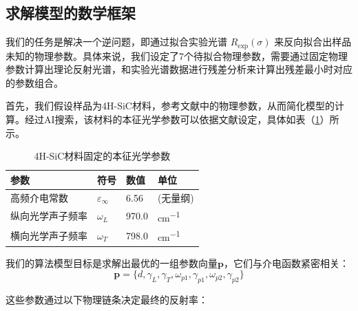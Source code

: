 \documentclass[a4paper]{ctexart}
\begin{document}


\subsection{求解模型的数学框架}
我们的任务是解决一个逆问题，即通过拟合实验光谱 $R_{\text{exp}}(\sigma)$ 来反向拟合出样品未知的物理参数。具体来说，我们设定了7个待拟合物理参数，需要通过固定物理参数计算出理论反射光谱，和实验光谱数据进行残差分析来计算出残差最小时对应的参数组合。

首先，我们假设样品为4H-SiC材料，参考文献中的物理参数，从而简化模型的计算。经过AI\cite{ai:gemini}搜索，该材料的本征光学参数可以依据文献\cite{oishi2006simultaneous}设定，具体如表（\ref{tab:sic_params}）所示。

\begin{table}[h!]
\centering
\caption{4H-SiC材料固定的本征光学参数}
\label{tab:sic_params}
\begin{tabular}{@{}llll@{}}
\toprule
参数 & 符号 & 数值 & 单位 \\ \midrule
高频介电常数 & $\varepsilon_{\infty}$ & 6.56 & (无量纲) \\
纵向光学声子频率 & $\omega_L$ & 970.0 & \si{cm^{-1}} \\
横向光学声子频率 & $\omega_T$ & 798.0 & \si{cm^{-1}} \\ \bottomrule
\end{tabular}
\end{table}
我们的算法模型目标是求解出最优的一组参数向量$\mathbf{p}$，它们与介电函数紧密相关：
\begin{equation}
    \mathbf{p} = \{d, \gamma_L, \gamma_T, \omega_{p1}, \gamma_{p1}, \omega_{p2}, \gamma_{p2}\}
\end{equation}

这些参数通过以下物理链条决定最终的反射率：
\end{document}
